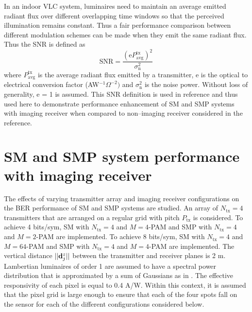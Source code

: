 In an indoor VLC system, luminaires need to maintain an average emitted radiant flux over different overlapping time windows so that the perceived illumination remains constant. Thus a fair performance comparison between different modulation schemes can be made when they emit the same radiant flux. Thus the SNR is defined as
\begin{equation}
  \label{eqOSMSNRTX}
	\text{SNR} = \frac{(\text{e}P_{\text{avg}}^{\text{tx}})^2}{\sigma_{\text{n}}^2}
\end{equation}
where $P_{\text{avg}}^{\text{tx}}$ is the average radiant flux emitted by a transmitter, e is the optical to electrical conversion factor (AW$^{-1}\Omega^{-2})$ and $\sigma_{\text{n}}^2$ is the noise power. Without loss of generality, e = 1 is assumed. This SNR definition is used in reference \cite{fat13a} and thus used here to demonstrate performance enhancement of SM and SMP systems with imaging receiver when compared to non--imaging receiver considered in the reference.

\section{SM and SMP system performance with imaging receiver}
\label{sec:osmAnalysis}

The effects of varying transmitter array and imaging receiver configurations on the BER performance of SM and SMP systems are studied. An array of $N_{\text{tx}} = 4$ transmitters that are arranged on a regular grid with pitch $P_{\text{tx}}$ is considered. To achieve 4 bits/sym, SM with $N_{\text{tx}}=4$ and $M=4$-PAM and SMP with $N_{\text{tx}}=4$ and $M=2$-PAM are implemented. To achieve 8 bits/sym, SM with $N_{\text{tx}}=4$ and $M=64$-PAM and SMP with $N_{\text{tx}}=4$ and $M=4$-PAM are implemented. The vertical distance $||{\bf{d}}^{z}_{j}||$ between the transmitter and receiver planes is 2 m. Lambertian luminaires of order 1 are assumed to have a spectral power distribution that is approximated by a sum of Gaussians as in \cite{gru08b}. The effective responsivity of each pixel is equal to 0.4 A/W. Within this context, it is assumed that the pixel grid is large enough to ensure that each of the four spots fall on the sensor for each of the different configurations considered below.

